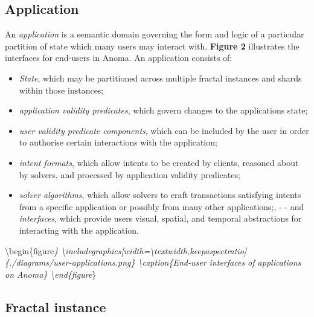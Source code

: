 \subsection{Application}\label{application}

An \emph{application} is a semantic domain governing the form and logic
of a particular partition of state which many users may interact with.
\textbf{Figure 2} illustrates the interfaces for end-users in Anoma. An
application consists of:

\begin{itemize}
\tightlist
\item
  \emph{State}, which may be partitioned across multiple fractal
  instances and shards within those instances;
\item
  \emph{application validity predicates}, which govern changes to the
  application\textquotesingle s state;
\item
  \emph{user validity predicate components}, which can be included by
  the user in order to authorise certain interactions with the
  application;
\item
  \emph{intent formats}, which allow intents to be created by clients,
  reasoned about by solvers, and processed by application validity
  predicates;
\item
  \emph{solver algorithms}, which allow solvers to craft transactions
  satisfying intents from a specific application or possibly from many
  other applications;, - - and \emph{interfaces}, which provide users
  visual, spatial, and temporal abstractions for interacting with the
  application.
\end{itemize}

\textbackslash begin\{figure\emph{\}
\textbackslash includegraphics{[}width=\textbackslash textwidth,keepaspectratio{]}\{./diagrams/user-applications.png\}
\textbackslash caption\{End-user interfaces of applications on Anoma\}
\textbackslash end\{figure}\}

\subsection{Fractal instance}\label{fractal-instance}

